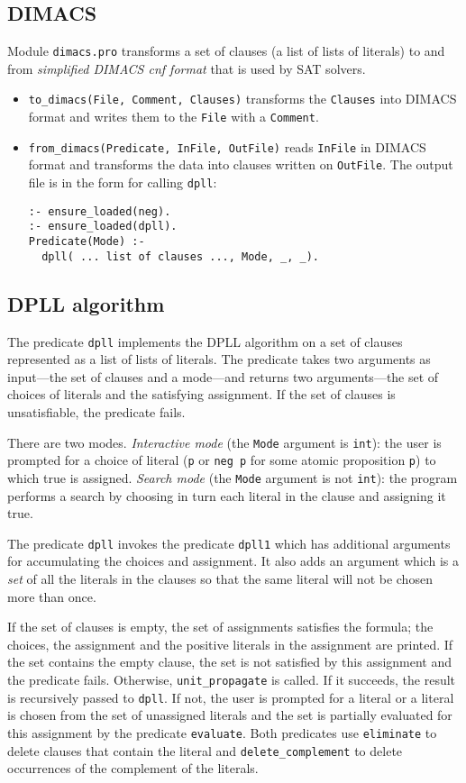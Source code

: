 \documentclass[11pt]{article}
\newcommand*{\p}[1]{\textup{\texttt{#1}}}
\begin{document}
\subsection{DIMACS}
Module \p{dimacs.pro} transforms a set of clauses (a list of lists
of literals) to and from \emph{simplified DIMACS cnf format} that is
used by SAT solvers.
\begin{itemize}
\item \p{to\_dimacs(File, Comment, Clauses)} transforms the \p{Clauses}
into DIMACS format and writes them to the \p{File} with a \p{Comment}. 

\item \p{from\_dimacs(Predicate, InFile, OutFile)} reads \p{InFile} in
DIMACS format and transforms the data into clauses written on
\p{OutFile}. The output file is in the form for calling \p{dpll}:
\begin{verbatim}
:- ensure_loaded(neg).
:- ensure_loaded(dpll).
Predicate(Mode) :-
  dpll( ... list of clauses ..., Mode, _, _).
\end{verbatim}
\end{itemize}

\subsection{DPLL algorithm}

The predicate \p{dpll} implements the DPLL algorithm on a set of clauses
represented as a list of lists of literals. The predicate takes two
arguments as input---the set of clauses and a mode---and returns two
arguments---the set of choices of literals and the satisfying
assignment. If the set of clauses is unsatisfiable, the predicate fails. 

There are two modes. \emph{Interactive mode} (the \p{Mode} argument is
\p{int}): the user is prompted for a choice of literal (\p{p} or \p{neg
p} for some atomic proposition \p{p}) to which true is assigned.
\emph{Search mode} (the \p{Mode} argument is not \p{int}): the program
performs a search by choosing in turn each literal in the clause and
assigning it true.

The predicate \p{dpll} invokes the predicate \p{dpll1} which has
additional arguments for accumulating the choices and assignment. It
also adds an argument which is a \emph{set} of all the literals in the
clauses so that the same literal will not be chosen more than once. 

If the set of clauses is empty, the set of assignments satisfies the
formula; the choices, the assignment and the positive literals in the
assignment are printed. If the set contains the empty clause, the set is
not satisfied by this assignment and the predicate fails. Otherwise,
\p{unit\_propagate} is called. If it succeeds, the result is recursively
passed to \p{dpll}. If not, the user is prompted for a literal or a
literal is chosen from the set of unassigned literals and the set is
partially evaluated for this assignment by the predicate \p{evaluate}.
Both predicates use \p{eliminate} to delete clauses that contain the
literal and \p{delete\_complement} to delete occurrences of the
complement of the literals.
\end{document}
